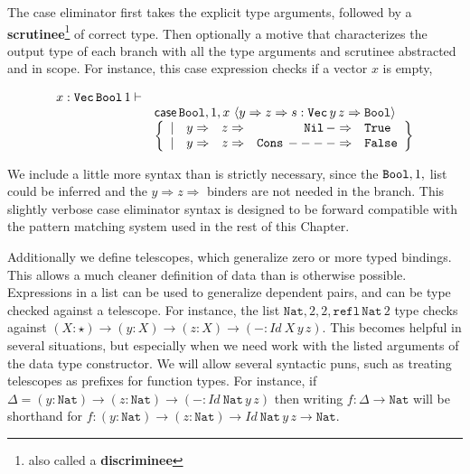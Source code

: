 


The case eliminator first takes the explicit type arguments, followed by a \textbf{scrutinee}\footnote{also called a \textbf{discriminee}} of correct type.
Then optionally a motive that characterizes the output type of each branch with all the type arguments and scrutinee abstracted and in scope.
For instance, this case expression checks if a vector $x$ is empty,

\[\begin{array}{rl}
x:\mathtt{Vec}{}\,\mathtt{Bool}{}\,1\vdash & \\
 & \mathsf{case}\,\mathtt{Bool}{},1,x\,\left\langle y\Rightarrow z\Rightarrow s:\mathtt{Vec}{}\,y\,z\Rightarrow\mathtt{Bool}{}\right\rangle \\
 & \left\{ 
    \begin{array}{rrrrl}
    |&y\Rightarrow& z\Rightarrow& \mathtt{Nil}{}\,-\Rightarrow& \mathtt{True}{} \\
    |&y\Rightarrow& z\Rightarrow& \mathtt{Cons}{}\,----\Rightarrow& \mathtt{False}{}
    \end{array}
    \right\} 
\end{array}
\]

We include a little more syntax than is strictly necessary, since the $\mathtt{Bool}{},1,$ list could be inferred and the $y\Rightarrow z\Rightarrow$ binders are not needed in the branch.
This slightly verbose case eliminator syntax is designed to be forward compatible with the pattern matching system used in the rest of this Chapter. 

Additionally we define telescopes, which generalize zero or more typed bindings.
This allows a much cleaner definition of data than is otherwise possible.
Expressions in a list can be used to generalize dependent pairs, and can be type checked against a telescope.
For instance, the list $\mathtt{Nat},2,2,\mathtt{refl}\,\mathtt{Nat}\,2$ type checks against $\left(X:\star\right)\rightarrow\left(y:X\right)\rightarrow\left(z:X\right)\rightarrow\left(-:Id\ X\,y\,z\right)$.
This becomes helpful in several situations, but especially when we need work with the listed arguments of the data type constructor.
We will allow several syntactic puns, such as treating telescopes as prefixes for function types. For instance, 
  if $\Delta=\left(y:\mathtt{Nat}\right)\rightarrow\left(z:\mathtt{Nat}\right)\rightarrow\left(-:Id\ \mathtt{Nat}\,y\,z\right)$
  then writing $f:\Delta\rightarrow\mathtt{Nat}$
  will be shorthand for $f:\left(y:\mathtt{Nat}\right)\rightarrow\left(z:\mathtt{Nat}\right)\rightarrow Id\ \mathtt{Nat}\,y\,z\rightarrow\mathtt{Nat}$.

